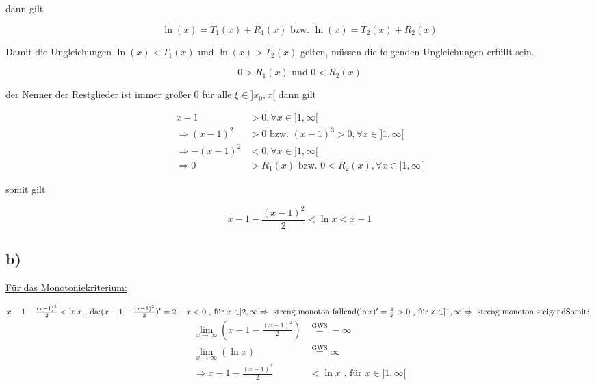 \documentclass[a4paper, 11pt]{article}
\begin{document}
dann gilt

\begin{equation*}
    \ln(x) = T_1(x) + R_1(x) \text{ bzw. } \ln(x) = T_2(x) + R_2(x)
\end{equation*}

Damit die Ungleichungen \(\ln(x) < T_1(x)\) und \(\ln(x) > T_2(x)\) gelten,
müssen die folgenden Ungleichungen erfüllt sein.

\begin{equation*}
    0 > R_1(x) \text{ und } 0 < R_2(x)
\end{equation*}

der Nenner der Restglieder ist immer größer 0 für alle \(\xi \in ]x_0, x[\)
dann gilt

\begin{align*}
    x - 1 &> 0, \forall x \in ]1, \infty[ \\
    \Rightarrow (x-1)^2 &> 0 \text{ bzw. } (x-1)^3 > 0, \forall x \in ]1, \infty[ \\
    \Rightarrow -(x-1)^2 &< 0, \forall x \in ]1, \infty[ \\
    \Rightarrow 0 &> R_1(x) \text{ bzw. } 0 < R_2(x), \forall x \in ]1, \infty[
\end{align*}

somit gilt

$$ x-1-\frac{(x-1)^2}{2} < \ln x < x - 1 $$

\subsection{b)}
\label{sec:org0591744}
\uline{Für das Monotoniekriterium:} \newline

\begin{math}
x-1-\frac{(x-1)^2}{2} < \ln x \text{ , da:}
\newline
\newline
(x-1-\frac{(x-1)^2}{2})' = 2-x < 0 \text{ , für } x \in ]2, \infty[ \Rightarrow \text{ streng monoton fallend}
\newline
\newline
(\ln x)' = \frac{1}{x} > 0 \text{ , für } x \in ]1, \infty[ \Rightarrow \text{ streng monoton steigend}
\newline
\newline
\text{Somit: }
\end{math}
\begin{align*}
	\lim \limits_{x \to \infty}\left( x-1-\frac{(x-1)^2}{2}\right) &\overset{\text{GWS}}{=} -\infty \\
	\lim \limits_{x \to \infty}(\ln x) &\overset{\text{GWS}}{=} \infty \\
	\Rightarrow x-1-\frac{(x-1)^2}{2} &< \ln x \text{ , für } x \in ]1, \infty[
\end{align*}
\end{document}

